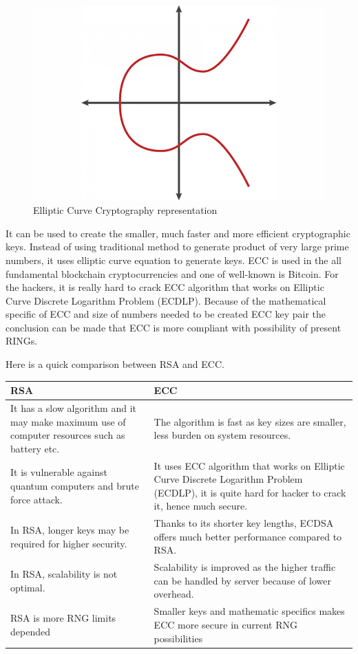\documentclass[runningheads]{llncs}
\begin{document}
\begin{figure}[h]
\includegraphics[width=\textwidth,height=0.5\textwidth]{fig01}
\caption{Elliptic Curve Cryptography representation}
\label{fig:01}
\end{figure}

It can be used to create the smaller, much faster and more efficient cryptographic keys. Instead of using traditional method to generate product of very large prime numbers, it uses elliptic curve equation to generate keys. ECC is used in the all fundamental blockchain cryptocurrencies and one of well-known is Bitcoin. For the hackers, it is really hard to crack ECC algorithm that works on Elliptic Curve Discrete Logarithm Problem (ECDLP). Because of the mathematical specific of ECC and size of numbers needed to be created ECC key pair the conclusion can be made that ECC is more compliant with possibility of present RINGs.

Here is a quick comparison between RSA and ECC.

\begin{center}
\begin{tabular}{ | m{6cm} | m{6cm} | }
\hline
RSA & ECC \\
\hline
It has a slow algorithm and it may make maximum use of computer resources such as battery etc. & The algorithm is fast as key sizes are smaller, less burden on system resources. \\
\hline
It is vulnerable against quantum computers and brute force attack. & It uses ECC algorithm that works on Elliptic Curve Discrete Logarithm Problem (ECDLP), it is quite hard for hacker to crack it, hence much secure. \\
\hline
In RSA, longer keys may be required for higher security. & Thanks to its shorter key lengths, ECDSA offers much better performance compared to RSA. \\
\hline
In RSA, scalability is not optimal. & Scalability is improved as the higher traffic can be handled by server because of lower overhead. \\
\hline
RSA is more RNG limits depended & Smaller keys and mathematic specifics makes ECC more secure in current RNG possibilities \\
\hline
\end{tabular}
\end{center}
\end{document}
